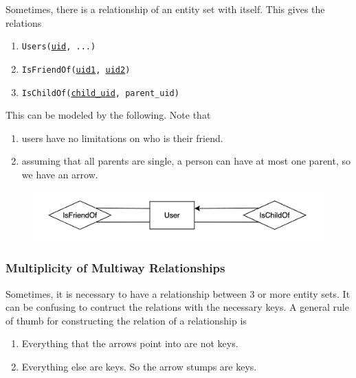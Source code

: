 \documentclass{article}
\begin{document}
      \begin{example}
        Sometimes, there is a relationship of an entity set with itself. This gives the relations 
        \begin{enumerate}
          \item \texttt{Users(\underline{uid}, ...)} 
          \item \texttt{IsFriendOf(\underline{uid1}, \underline{uid2})} 
          \item \texttt{IsChildOf(\underline{child\_uid}, parent\_uid)}
        \end{enumerate}
        This can be modeled by the following. Note that 
        \begin{enumerate}
          \item users have no limitations on who is their friend. 
          \item assuming that all parents are single, a person can have at most one parent, so we have an arrow.  
        \end{enumerate}
        \begin{figure}[H]
          \centering 
          \includegraphics[scale=0.3]{img/within_itself.png}
          \caption{} 
          \label{fig:within_itself}
        \end{figure}
      \end{example}

    \subsubsection{Multiplicity of Multiway Relationships}

      Sometimes, it is necessary to have a relationship between 3 or more entity sets. It can be confusing to contruct the relations with the necessary keys. A general rule of thumb for constructing the relation of a relationship is 
      \begin{enumerate}
        \item Everything that the arrows point into are not keys.   
        \item Everything else are keys. So the arrow stumps are keys. 
      \end{enumerate}
\end{document}
